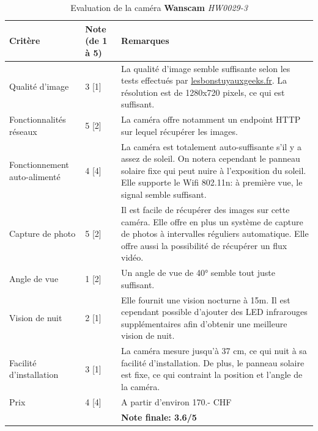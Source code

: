 \begin{table}[H]
    \centering
    \caption{Evaluation de la caméra \textbf{Wanscam} \textit{HW0029-3}}
    \label{cam:wan3_eval}
    \begin{tabular}{@{}llp{8cm}@{}}
        \toprule
        Critère                              & Note (de 1 à 5) & Remarques                                                                                                                                                                   \\ \midrule
        Qualité d'image              & 3 [1]               & La qualité d'image semble suffisante selon les tests effectués par \url{lesbonstuyauxgeeks.fr}\autocite{cam:wan3-test}. La résolution est de 1280x720 pixels, ce qui est suffisant. \\ [0.8ex]
        Fonctionnalités réseaux      & 5 [2]              & La caméra offre notamment un endpoint HTTP sur lequel récupérer les images.                                                                                                \\ [0.8ex]
        Fonctionnement auto-alimenté & 4 [4]              & La caméra est totalement auto-suffisante s'il y a assez de soleil. On notera cependant le panneau solaire fixe qui peut nuire à l'exposition du soleil. Elle supporte le Wifi 802.11n: à première vue, le signal semble suffisant.                   \\ [0.8ex]
        Capture de photo             & 5 [2]              & Il est facile de récupérer des images sur cette caméra. Elle offre en plus un système de capture de photos à intervalles réguliers automatique. Elle offre aussi la possibilité de récupérer un flux vidéo.                            \\ [0.8ex]
        Angle de vue                 & 1 [2]              & Un angle de vue de 40° semble tout juste suffisant.                                                                                                                        \\ [0.8ex]
        Vision de nuit               & 2 [1]               & Elle fournit une vision nocturne à 15m. Il est cependant possible d'ajouter des LED infrarouges supplémentaires afin d'obtenir une meilleure vision de nuit\autocite{cam:wan3-url}. \\ [0.8ex]
        Facilité d'installation      & 3 [1]              & La caméra mesure jusqu'à 37 cm, ce qui nuit à sa facilité d'installation. De plus, le panneau solaire est fixe, ce qui contraint la position et l'angle de la caméra.      \\ [0.8ex]
        Prix                         & 4 [4]              & A partir d'environ 170.- CHF \\ \midrule
        && \textbf{Note finale: 3.6/5} \\ \bottomrule
    \end{tabular}
\end{table}


